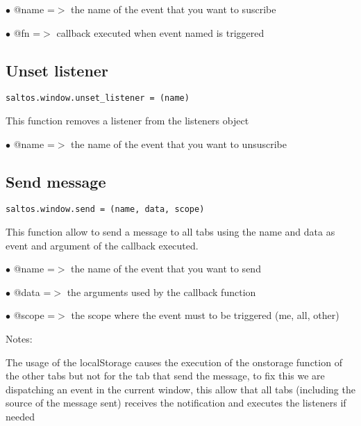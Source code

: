 \documentclass[a4paper]{book}
\begin{document}
\begin{compactitem}
\item[\color{myblue}$\bullet$] @name =$>$ the name of the event that you want to suscribe
\item[\color{myblue}$\bullet$] @fn   =$>$ callback executed when event named is triggered
\end{compactitem}

\hypertarget{toc448}{}
\subsection{Unset listener}

\begin{lstlisting}
saltos.window.unset_listener = (name)
\end{lstlisting}

This function removes a listener from the listeners object

\begin{compactitem}
\item[\color{myblue}$\bullet$] @name =$>$ the name of the event that you want to unsuscribe
\end{compactitem}

\hypertarget{toc449}{}
\subsection{Send message}

\begin{lstlisting}
saltos.window.send = (name, data, scope)
\end{lstlisting}

This function allow to send a message to all tabs using the name and data
as event and argument of the callback executed.

\begin{compactitem}
\item[\color{myblue}$\bullet$] @name  =$>$ the name of the event that you want to send
\item[\color{myblue}$\bullet$] @data  =$>$ the arguments used by the callback function
\item[\color{myblue}$\bullet$] @scope =$>$ the scope where the event must to be triggered (me, all, other)
\end{compactitem}

Notes:

The usage of the localStorage causes the execution of the onstorage function
of the other tabs but not for the tab that send the message, to fix this we
are dispatching an event in the current window, this allow that all tabs
(including the source of the message sent) receives the notification and
executes the listeners if needed
\end{document}
